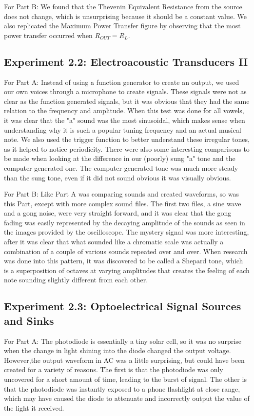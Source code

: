 \documentclass[10pt]{article}
\begin{document}
For Part B: We found that the Thevenin Equivalent Resistance from the source does not change, which is unsurprising because it should be a constant value. We also replicated the Maximum Power Transfer figure by observing that the most power transfer occurred when $R_{OUT} = R_L$. 

\subsection{Experiment 2.2: Electroacoustic Transducers II}
For Part A: Instead of using a function generator to create an output, we used our own voices through a microphone to create signals. These signals were not as clear as the function generated signals, but it was obvious that they had the same relation to the frequency and amplitude. When this test was done for all vowels, it was clear that the "a" sound was the most sinusoidal, which makes sense when understanding why it is such a popular tuning frequency and an actual musical note. We also used the trigger function to better understand these irregular tones, as it helped to notice periodicity. There were also some interesting comparisons to be made when looking at the difference in our (poorly) sung "a" tone and the computer generated one. The computer generated tone was much more steady than the sung tone, even if it did not sound obvious it was visually obvious. 

For Part B: Like Part A was comparing sounds and created waveforms, so was this Part, except with more complex sound files. The first two files, a sine wave and a gong noise, were very straight forward, and it was clear that the gong fading was easily represented by the decaying amplitude of the sounds as seen in the images provided by the oscilloscope. The mystery signal was more interesting, after it was clear that what sounded like a chromatic scale was actually a combination of a couple of various sounds repeated over and over. When research was done into this pattern, it was discovered to be called a Shepard tone, which is a superposition of octaves at varying amplitudes that creates the feeling of each note sounding slightly different from each other.

\subsection{Experiment 2.3: Optoelectrical Signal Sources and Sinks}

For Part A: The photodiode is essentially a tiny solar cell, so it was no surprise when the change in light shining into the diode changed the output voltage. However,the output waveform in AC was a little surprising, but could have been created for a variety of reasons. The first is that the photodiode was only uncovered for a short amount of time, leading to the burst of signal. The other is that the photodiode was instantly exposed to a phone flashlight at close range, which may have caused the diode to attenuate and incorrectly output the value of the light it received.
\end{document}
